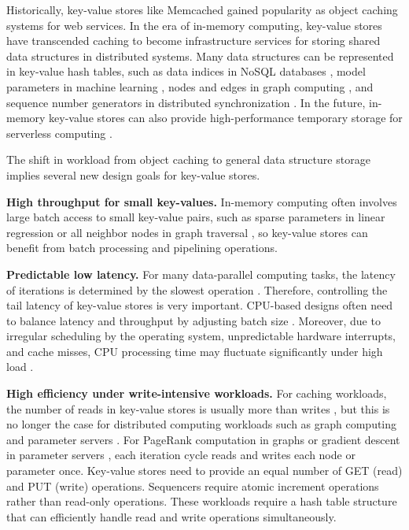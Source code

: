 {{Historically, key-value stores like Memcached \cite{fitzpatrick2004distributed} gained popularity as object caching systems for web services. In the era of in-memory computing, key-value stores have transcended caching to become infrastructure services for storing shared data structures in distributed systems. Many data structures can be represented in key-value hash tables, such as data indices in NoSQL databases \cite{chang2008bigtable}, model parameters in machine learning \cite{li2014scaling}, nodes and edges in graph computing \cite{shao2013trinity,xiao17tux2}, and sequence number generators in distributed synchronization \cite{kalia2016design,eris}. In the future, in-memory key-value stores can also provide high-performance temporary storage for serverless computing \cite{jonas2019cloud}.

The shift in workload from object caching to general data structure storage implies several new design goals for key-value stores.

\textbf{High throughput for small key-values.} In-memory computing often involves large batch access to small key-value pairs, such as sparse parameters in linear regression \cite{li2014algorithmic,xiao17tux2} or all neighbor nodes in graph traversal \cite{shao2013trinity}, so key-value stores can benefit from batch processing and pipelining operations.

\textbf{Predictable low latency.} For many data-parallel computing tasks, the latency of iterations is determined by the slowest operation \cite{ousterhout2015ramcloud}. Therefore, controlling the tail latency of key-value stores is very important. CPU-based designs often need to balance latency and throughput by adjusting batch size \cite{li2016full}. Moreover, due to irregular scheduling by the operating system, unpredictable hardware interrupts, and cache misses, CPU processing time may fluctuate significantly under high load \cite{li2016clicknp}.

\textbf{High efficiency under write-intensive workloads.} For caching workloads, the number of reads in key-value stores is usually more than writes \cite{atikoglu2012workload}, but this is no longer the case for distributed computing workloads such as graph computing \cite{page1999pagerank} and parameter servers \cite{li2014scaling}. For PageRank computation in graphs \cite{page1999pagerank} or gradient descent in parameter servers \cite{li2014scaling}, each iteration cycle reads and writes each node or parameter once. Key-value stores need to provide an equal number of GET (read) and PUT (write) operations. Sequencers \cite{kalia2016design} require atomic increment operations rather than read-only operations. These workloads require a hash table structure that can efficiently handle read and write operations simultaneously.

}}
